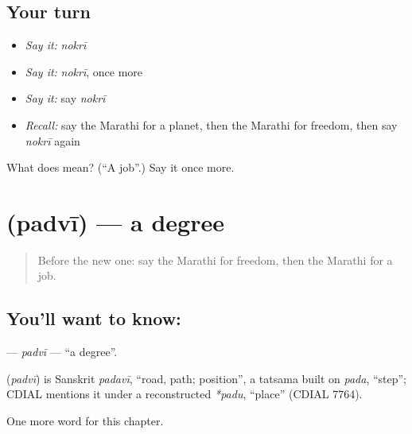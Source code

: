 \subsection*{Your turn}
\begin{itemize}
\raggedright
  \item \emph{Say it:} \emph{nokrī}
  \item \emph{Say it:} \emph{nokrī}, once more
  \item \emph{Say it:} say \emph{nokrī}
  \item \emph{Recall:} say the Marathi for a planet, then the Marathi for freedom, then say \emph{nokrī} again
\end{itemize}

\begin{tcolorbox}[breakable,colback=teal!4,colframe=teal!35!black,title={Before you move on}]
What does  mean? (\textquotedblleft{}A job\textquotedblright{}.) Say it once more.
\end{tcolorbox}
\section[\texorpdfstring{\mr{पदवी} (padvī)}{पदवी (padvī)}]{ (padvī) — a degree}

\label{lesson:MR-C247-padvi}



\begin{quote}
Before the new one: say the Marathi for freedom, then the Marathi for a job.
\end{quote}

\subsection*{You'll want to know: }
\textbf{} — \emph{padvī} — \textquotedblleft{}a degree\textquotedblright{}.

\begin{cousinweb}
\textbf{} (\emph{padvī}) is Sanskrit \emph{padavī}, \textquotedblleft{}road, path; position\textquotedblright{}, a tatsama built on \emph{pada}, \textquotedblleft{}step\textquotedblright{}; CDIAL mentions it under a reconstructed \emph{*padu}, \textquotedblleft{}place\textquotedblright{} (CDIAL 7764).
\end{cousinweb}

\begin{grammarlens}[title={What you've built}]
One more word for this chapter.
\end{grammarlens}

